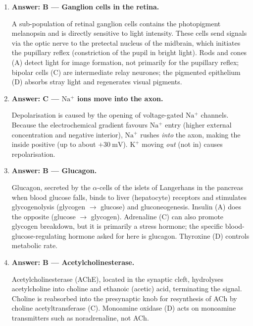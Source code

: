 \documentclass[11pt]{article}
\newcommand{\cle}[1]{{\popxbold\color{popdark}#1}}
\begin{document}
\begin{corrige}
\begin{enumerate}
\item \textbf{Answer: B — Ganglion cells in the retina.}\par
A sub-population of retinal ganglion cells contains the photopigment \cle{melanopsin} and is directly sensitive to light intensity. These cells send signals via the optic nerve to the pretectal nucleus of the midbrain, which initiates the \cle{pupillary reflex} (constriction of the pupil in bright light). Rods and cones (A) detect light for image formation, not primarily for the pupillary reflex; bipolar cells (C) are intermediate relay neurones; the pigmented epithelium (D) absorbs stray light and regenerates visual pigments.

\item \textbf{Answer: C — $\mathrm{Na^+}$ ions move into the axon.}\par
Depolarisation is caused by the opening of voltage-gated $\mathrm{Na^+}$ channels. Because the electrochemical gradient favours $\mathrm{Na^+}$ entry (higher external concentration and negative interior), $\mathrm{Na^+}$ rushes \emph{into} the axon, making the inside positive (up to about $+30\ \mathrm{mV}$). $\mathrm{K^+}$ moving \emph{out} (not in) causes repolarisation.

\item \textbf{Answer: B — Glucagon.}\par
\cle{Glucagon}, secreted by the $\alpha$-cells of the islets of Langerhans in the pancreas when blood glucose falls, binds to liver (hepatocyte) receptors and stimulates \cle{glycogenolysis} (glycogen $\rightarrow$ glucose) and gluconeogenesis. Insulin (A) does the opposite (glucose $\rightarrow$ glycogen). Adrenaline (C) can also promote glycogen breakdown, but it is primarily a stress hormone; the specific blood-glucose-regulating hormone asked for here is glucagon. Thyroxine (D) controls metabolic rate.

\item \textbf{Answer: B — Acetylcholinesterase.}\par
\cle{Acetylcholinesterase} (AChE), located in the synaptic cleft, hydrolyses acetylcholine into choline and ethanoic (acetic) acid, terminating the signal. Choline is reabsorbed into the presynaptic knob for resynthesis of ACh by choline acetyltransferase (C). Monoamine oxidase (D) acts on monoamine transmitters such as noradrenaline, not ACh.
\end{enumerate}
\end{corrige}
\end{document}
